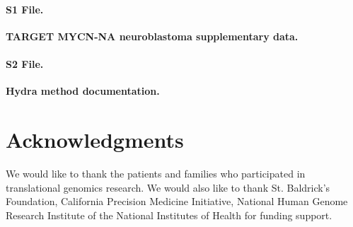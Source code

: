 \documentclass[10pt,letterpaper]{article}
\begin{document}
\paragraph*{S1 File.}
\label{S1_File}
{\bf TARGET MYCN-NA neuroblastoma supplementary data.}

\paragraph*{S2 File.}
\label{S2_File}
{\bf Hydra method documentation.}




\section*{Acknowledgments}
We would like to thank the patients and families who participated in translational genomics research. We would also like to thank St. Baldrick's Foundation, California Precision Medicine Initiative, National Human Genome Research Institute of the National Institutes of Health for funding support.

\nolinenumbers

%
%
% 
\end{document}
